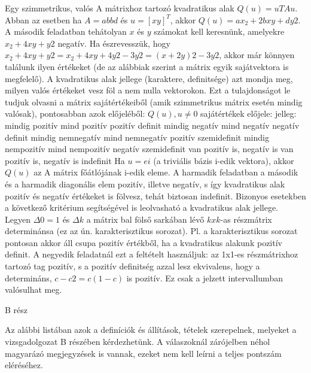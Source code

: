 \begin{frame}
  \begin{tcolorbox}[title={12/4. {\symknight}}]
     Egy szimmetrikus, valós A mátrixhoz tartozó kvadratikus alak $Q(u) = uTAu$. Abban az esetben ha $A =  a b b d$  és $u = [x y]^T$, akkor $Q(u) = ax_2 + 2bxy + dy2$. A második feladatban tehátolyan $x$ és $y$ számokat kell keresnünk, amelyekre $x_2 + 4xy + y2$ negatív. Ha észrevesszük, hogy $x_2 + 4xy + y2 = x_2 + 4xy + 4y2 -3y2 = (x + 2y)2 -3y2$, akkor már könnyen találunk ilyen értékeket (de az alábbiak szerint a mátrix egyik sajátvektora is megfelelő). A kvadratikus alak jellege (karaktere, definitsége) azt mondja meg, milyen valós értékeket vesz föl a nem nulla vektorokon. Ezt a tulajdonságot le tudjuk olvasni a mátrix sajátértékeiből (amik szimmetrikus mátrix esetén mindig valósak), pontosabban azok előjeléből: $Q(u), u \neq 0$ sajátértékek előjele: jelleg: mindig pozitív mind pozitív pozitív definit mindig negatív mind negatív negatív definit mindig nemnegatív mind nemnegatív pozitív szemidefinit mindig nempozitív mind nempozitív negatív szemidefinit van pozitív is, negatív is van pozitív is, negatív is indefinit Ha $u = ei$ (a triviális bázis i-edik vektora), akkor $Q(u)$ az A mátrix főátlójának i-edik eleme. A harmadik feladatban a második és a harmadik diagonális elem pozitív, illetve negatív, s így kvadratikus alak pozitív és negatív értékeket is fölvesz, tehát biztosan indefinit. Bizonyos esetekben a következő kritérium segítségével is leolvasható a kvadratikus alak jellege. Legyen ${\Delta}0 = 1$ és ${\Delta}k$ a mátrix bal fölső sarkában lévő $k xk$-as részmátrix determinánsa (ez az ún. karakterisztikus sorozat). Pl. a karakterisztikus sorozat pontosan akkor áll csupa pozitív értékből, ha a kvadratikus alakunk pozitív definit. A negyedik feladatnál ezt a feltételt használjuk: az 1x1-es részmátrixhoz tartozó tag pozitív, s a pozitív definitség azzal lesz ekvivalens, hogy a determináns, $c-c2 = c(1-c)$ is pozitív. Ez csak a jelzett intervallumban valósulhat meg.
  \end{tcolorbox}
\end{frame}


\begin{frame}[plain]
\begin{tcolorbox}[center, colback={myyellow}, coltext={black}, colframe={myyellow}]
    {\RHuge  B rész}
    \mmedskip
\end{tcolorbox}
\end{frame}


\begin{frame}
  \begin{tcolorbox}[title={12/4. {\symknight}}]
     Az alábbi listában azok a definíciók és állítások, tételek szerepelnek, melyeket a vizsgadolgozat B részében kérdezhetünk. A válaszoknál zárójelben néhol magyarázó megjegyzések is vannak, ezeket nem kell leírni a teljes pontszám eléréséhez.
  \end{tcolorbox}
\end{frame}

